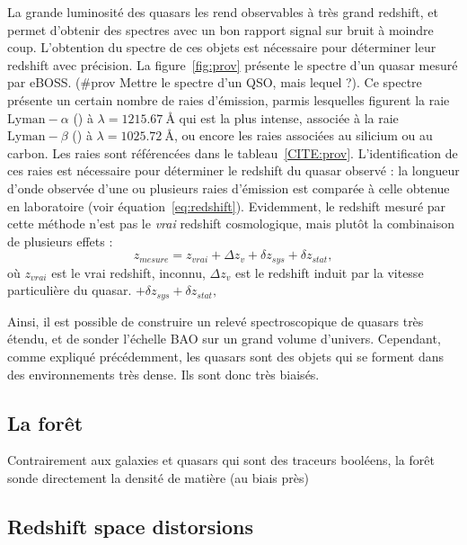 \documentclass[11pt, twoside, a4paper, openright]{report}
\begin{document}
La grande luminosité des quasars les rend observables à très grand redshift, et permet d'obtenir des spectres avec un bon rapport signal sur bruit à moindre coup. L'obtention du spectre de ces objets est nécessaire pour déterminer leur redshift avec précision. La figure~\ref{fig:prov} présente le spectre d'un quasar mesuré par eBOSS. (\#prov Mettre le spectre d'un QSO, mais lequel ?). Ce spectre présente un certain nombre de raies d'émission, parmis lesquelles figurent la raie $\mathrm{Lyman-}\alpha$ (\lya{}) à $\lambda = \SI{1215.67}{\angstrom}$ qui est la plus intense, associée à la raie  $\mathrm{Lyman-}\beta$ (\lyb{}) à $\lambda = \SI{1025.72}{\angstrom}$, ou encore les raies associées au silicium ou au carbon. Les raies sont référencées dans le tableau~\ref{CITE:prov}. L'identification de ces raies est nécessaire pour déterminer le redshift du quasar observé : la longueur d'onde observée d'une ou plusieurs raies d'émission est comparée à celle obtenue en laboratoire (voir équation~\ref{eq:redshift}). Evidemment, le redshift mesuré par cette méthode n'est pas le \emph{vrai} redshift cosmologique, mais plutôt la combinaison de plusieurs effets :
\begin{equation}
  \label{eq:z_qso}
  z_{mesure} = z_{vrai} + \Delta z_v + \delta z_{sys} + \delta z_{stat},
\end{equation}
où $z_{vrai}$ est le vrai redshift, inconnu, $\Delta z_v$ est le redshift induit par la vitesse particulière du quasar.  $+ \delta z_{sys} + \delta z_{stat},$

Ainsi, il est possible de construire un relevé spectroscopique de quasars très étendu, et de sonder l'échelle BAO sur un grand volume d'univers. Cependant, comme expliqué précédemment, les quasars sont des objets qui se forment dans des environnements très dense. Ils sont donc très biaisés.




\subsection{La forêt \lya{}}
Contrairement aux galaxies et quasars qui sont des traceurs booléens, la forêt \lya{} sonde directement la densité de matière (au biais près)


\subsection{Redshift space distorsions}
\end{document}

